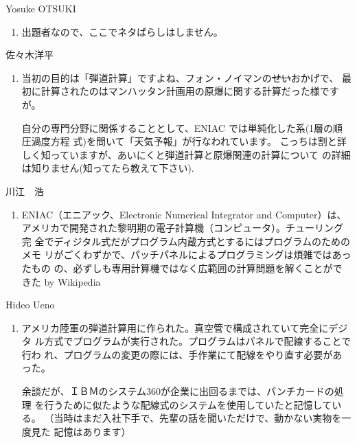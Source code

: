 \documentclass[mingoth,a4paper]{jsarticle}
\begin{document}
\begin{prework}{ Yosuke OTSUKI }
  \begin{enumerate}
  \item 出題者なので、ここでネタばらしはしません。
  \end{enumerate}
\end{prework}

\begin{prework}{ 佐々木洋平 }
  \begin{enumerate}
  \item 当初の目的は「弾道計算」ですよね、フォン・ノイマンの\sout{せい}おかげで、
    最初に計算されたのはマンハッタン計画用の原爆に関する計算だった様ですが。

    自分の専門分野に関係することとして、ENIAC では単純化した系(1層の順圧渦度方程
    式)を問いて「天気予報」が行なわれています。
    こっちは割と詳しく知っていますが、あいにくと弾道計算と原爆関連の計算について
    の詳細は知りません(知ってたら教えて下さい).
  \end{enumerate}
\end{prework}

\begin{prework}{ 川江　浩 }
  \begin{enumerate}
  \item ENIAC（エニアック、Electronic Numerical Integrator and Computer）は、
    アメリカで開発された黎明期の電子計算機（コンピュータ）。チューリング完
    全でディジタル式だがプログラム内蔵方式とするにはプログラムのためのメモ
    リがごくわずかで、パッチパネルによるプログラミングは煩雑ではあったもの
    の、必ずしも専用計算機ではなく広範囲の計算問題を解くことができた
    by Wikipedia
  \end{enumerate}
\end{prework}

\begin{prework}{ Hideo Ueno }
  \begin{enumerate}
  \item アメリカ陸軍の弾道計算用に作られた。真空管で構成されていて完全にデジタ
    ル方式でプログラムが実行された。プログラムはパネルで配線することで行わ
    れ、プログラムの変更の際には、手作業にて配線をやり直す必要があった。

    余談だが、ＩＢＭのシステム360が企業に出回るまでは、パンチカードの処理
    を行うために似たような配線式のシステムを使用していたと記憶している。
    （当時はまだ入社下手で、先輩の話を聞いただけで、動かない実物を一度見た
    記憶はあります）
  \end{enumerate}
\end{prework}
\end{document}
